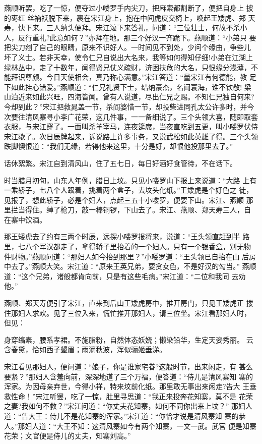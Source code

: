燕顺听罢，吃了一惊，便夺过小喽罗手内尖刀，把麻索都割断了，便把自身上
披的枣红丝衲袄脱下来，裹在宋江身上，抱在中间虎皮交椅上，唤起王矮虎、郑
天寿，快下来。三人纳头便拜。宋江滚下来答礼，问道：“三位壮士，何故不杀小
人，反行重礼?此意如何？”亦拜在地。那三个好汉一齐跪下。燕顺道：“小弟只
要把尖刀剜了自己的眼睛，原来不识好人。一时间见不到处，少问个缘由，争些儿
坏了义士。若非天幸，使令仁兄自说出大名来，我等如何得知仔细!小弟在江湖上
绿林丛中，走了十数年，闻得贤兄仗义疏财，济困扶危的大名，只恨缘分浅薄，不
能拜识尊颜。今日天使相会，真乃称心满意。”宋江答道：“量宋江有何德能，教
足下如此挂心错爱。”燕顺道：“仁兄礼贤下士，结纳豪杰，名闻寰海，谁不钦敬!
梁山泊近来如此兴旺，四海皆闻。曾有人说道，尽出仁兄之赐。不知仁兄独自何来?
今却到此？”宋江把救晁盖一节，杀阎婆惜一节，却投柴进同孔太公许多时，并今
次要往清风寨寻小李广花荣，这几件事，一一备细说了。三个头领大喜，随即取套
衣服，与宋江穿了。一面叫杀羊宰马，连夜筵席，当夜直吃到五更，叫小喽罗伏侍
宋江歇了。次日辰牌起来，诉说路上许多事务，又说武松如此英雄了得。三个头领
跌脚懊恨道：“我们无缘，若得他来这里，十分是好，却恨他投那里去了。”

话休絮繁。宋江自到清风山，住了五七日，每日好酒好食管待，不在话下。

时当腊月初旬，山东人年例，腊日上坟。只见小喽罗山下报上来说道：“大路
上有一乘轿子，七八个人跟着，挑着两个盒子，去坟头化纸。”王矮虎是个好色之
徒，见报了，想此轿子，必是个妇人，点起三五十小喽罗，便要下山。宋江、燕顺
那里拦当得住。绰了枪刀，敲一棒铜锣，下山去了。宋江、燕顺、郑天寿三人，自
在寨中饮酒。

那王矮虎去了约有三两个时辰，远探小喽罗报将来，说道：“王头领直赶到半
路里，七八个军汉都走了，拿得轿子里抬着的一个妇人。只有一个银香盒，别无物
件财物。”燕顺问道：“那妇人如今抬到那里？”小喽罗道：“王头领已自抬在山
后房中去了。”燕顺大笑。宋江道：“原来王英兄弟，要贪女色，不是好汉的勾当。”
燕顺道：“这个兄弟，诸般都肯向前，只是有这些毛病。”宋江道：“二位和我同
去劝他。”

燕顺、郑天寿便引了宋江，直来到后山王矮虎房中，推开房门，只见王矮虎正
搂住那妇人求欢。见了三位入来，慌忙推开那妇人，请三位坐。宋江看那妇人时，
但见：

身穿缟素，腰系孝裙。不施脂粉，自然体态妖娆；懒染铅华，生定天姿秀丽。
云含春黛，恰如西子颦眉；雨滴秋波，浑似骊姬垂涕。

宋江看见那妇人，便问道：“娘子，你是谁家宅眷?这般时节，出来闲走，有
甚么要紧？”那妇人含羞向前，深深地道了三个万福，便答道：“侍儿是清风寨知
寨的浑家。为因母亲弃世，今得小祥，特来坟前化纸。那里敢无事出来闲走?告大
王垂救性命！”宋江听罢，吃了一惊，肚里寻思道：“我正来投奔花知寨，莫不是
花荣之妻?我如何不救？”宋江问道：“你丈夫花知寨，如何不同你出来上坟？”
那妇人道：“告大王：侍儿不是花知寨的浑家。”宋江道：“你恰才说是清风寨知
寨的恭人。”那妇人道：“大王不知：这清风寨如今有两个知寨，一文一武。武官
便是知寨花荣；文官便是侍儿的丈夫，知寨刘高。”


